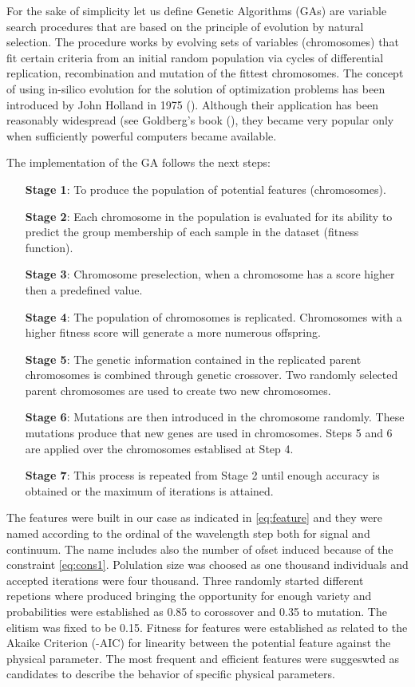 {{
For the sake of simplicity let us define 
Genetic Algorithms (GAs) are variable search procedures that are based on
the principle of evolution by natural selection. The procedure works by
evolving sets of variables (chromosomes) that fit certain criteria from an initial
random population via cycles of differential replication, recombination and
mutation of the fittest chromosomes. The concept of using in-silico evolution
for the solution of optimization problems has been introduced by John
Holland in 1975 (\cite{holland1975adaptation}). Although their application has been
reasonably widespread (see Goldberg\textquoteright s 
book (\cite{goldberg1989genetic}), they became
very popular only when sufficiently powerful computers became available.
}

{
The implementation of the GA follows the next steps:
\begin{itemize}
 \item [\textbf{Stage 1}:]{To produce the population of potential features (chromosomes).}
 \item [\textbf{Stage 2}:]{Each chromosome in the population is evaluated for its ability to
predict the group membership of each sample in the dataset (fitness function).}
 \item [\textbf{Stage 3}:]{Chromosome preselection, when a chromosome has 
 a score higher then a predefined value.}
 \item [\textbf{Stage 4}:]{The population of chromosomes is replicated. 
 Chromosomes with a higher fitness score will 
 generate a more numerous offspring.}
 \item [\textbf{Stage 5}:]{The genetic information contained in the replicated parent
chromosomes is combined through genetic crossover. Two randomly selected
parent chromosomes are used to create two new chromosomes.}
 \item [\textbf{Stage 6}:]{Mutations are then introduced in the chromosome randomly. 
 These mutations produce that new genes are used in chromosomes.
 Steps 5 and 6 are applied over the chromosomes establised at Step 4.}
  \item [\textbf{Stage 7}:]{This process is repeated from Stage 2 until 
  enough accuracy is obtained or the maximum of iterations is attained.}
\end{itemize}

The features were built in our case as indicated in \ref{eq:feature} and 
they were named according to the ordinal of the wavelength step both for signal and
continuum. The name includes also the number of ofset induced because of the constraint \ref{eq:cons1}.
Polulation size was choosed as one thousand individuals and accepted iterations were four thousand.
Three randomly started different repetions where produced bringing the opportunity for enough variety
and probabilities were established as 0.85 to corossover and 0.35 to mutation. The elitism was fixed to be 0.15.
Fitness for features were established as related to the Akaike Criterion (-AIC) 
for linearity between the potential feature against the physical parameter.
The most frequent and efficient features were suggeswted as candidates to describe the behavior of specific 
physical parameters. 

}}
